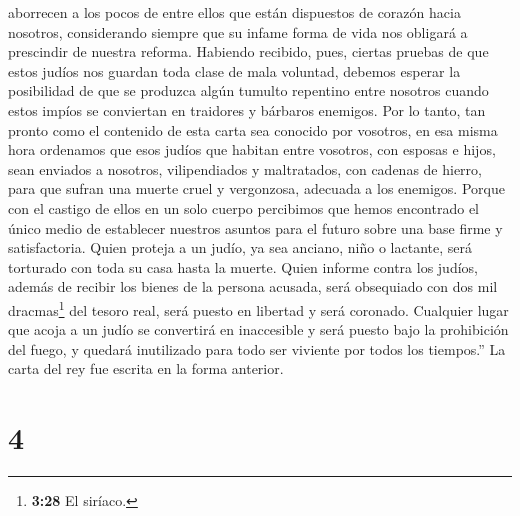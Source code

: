aborrecen a los pocos de entre ellos que están dispuestos de corazón
hacia nosotros, considerando siempre que su infame forma de vida nos
obligará a prescindir de nuestra reforma.  Habiendo
recibido, pues, ciertas pruebas de que estos judíos nos guardan toda
clase de mala voluntad, debemos esperar la posibilidad de que se
produzca algún tumulto repentino entre nosotros cuando estos impíos se
conviertan en traidores y bárbaros enemigos.  Por lo
tanto, tan pronto como el contenido de esta carta sea conocido por
vosotros, en esa misma hora ordenamos que esos judíos que habitan entre
vosotros, con esposas e hijos, sean enviados a nosotros, vilipendiados y
maltratados, con cadenas de hierro, para que sufran una muerte cruel y
vergonzosa, adecuada a los enemigos.  Porque con el
castigo de ellos en un solo cuerpo percibimos que hemos encontrado el
único medio de establecer nuestros asuntos para el futuro sobre una base
firme y satisfactoria.  Quien proteja a un judío, ya sea
anciano, niño o lactante, será torturado con toda su casa hasta la
muerte.  Quien informe contra los judíos, además de
recibir los bienes de la persona acusada, será obsequiado con dos mil
dracmas\footnote{\textbf{3:28} El siríaco.} del tesoro real, será puesto
en libertad y será coronado.  Cualquier lugar que acoja a
un judío se convertirá en inaccesible y será puesto bajo la prohibición
del fuego, y quedará inutilizado para todo ser viviente por todos los
tiempos.''  La carta del rey fue escrita en la forma
anterior.

\hypertarget{section-3}{%
\section{4}\label{section-3}}

